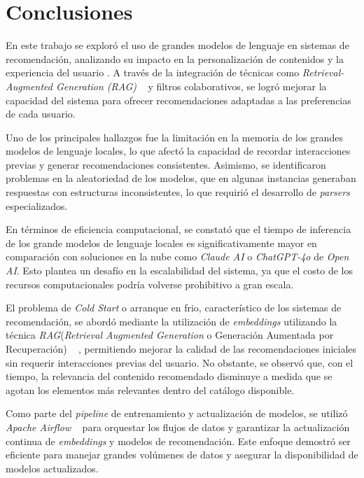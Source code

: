 \documentclass[11pt,a4paper,twoside]{thesis}
\begin{document}
\chapter{Conclusiones}

En este trabajo se exploró el uso de grandes modelos de lenguaje en sistemas de recomendación, analizando su impacto en la personalización de contenidos y la experiencia del usuario \cite{chatrec}. A través de la integración de técnicas como \textit{Retrieval-Augmented Generation (RAG)} ~\cite{rag} y filtros colaborativos, se logró mejorar la capacidad del sistema para ofrecer recomendaciones adaptadas a las preferencias de cada usuario.

Uno de los principales hallazgos fue la limitación en la memoria de los grandes modelos de lenguaje locales, lo que afectó la capacidad de recordar interacciones previas y generar recomendaciones consistentes. Asimismo, se identificaron problemas en la aleatoriedad de los modelos, que en algunas instancias generaban respuestas con estructuras inconsistentes, lo que requirió el desarrollo de \textit{parsers} especializados.

En términos de eficiencia computacional, se constató que el tiempo de inferencia de los grande modelos de lenguaje locales es significativamente mayor en comparación con soluciones en la nube como \textit{Claude AI} o \textit{ChatGPT-4o } de \textit{Open AI}. Esto plantea un desafío en la escalabilidad del sistema, ya que el costo de los recursos computacionales podría volverse prohibitivo a gran escala.

El problema de \textit{Cold Start} o arranque en frio, característico de los sistemas de recomendación, se abordó mediante la utilización de \textit{embeddings} utilizando la técnica \textit{RAG}(\textit{Retrieval Augmented Generation} o Generación Aumentada por Recuperación) ~\cite{rag} , permitiendo mejorar la calidad de las recomendaciones iniciales sin requerir interacciones previas del usuario. No obstante, se observó que, con el tiempo, la relevancia del contenido recomendado disminuye a medida que se agotan los elementos más relevantes dentro del catálogo disponible.

Como parte del \textit{pipeline} de entrenamiento y actualización de modelos, se utilizó \textit{Apache Airflow} ~\cite{apache-airflow} para orquestar los flujos de datos y garantizar la actualización continua de \textit{embeddings} y modelos de recomendación. Este enfoque demostró ser eficiente para manejar grandes volúmenes de datos y asegurar la disponibilidad de modelos actualizados.
\end{document}
